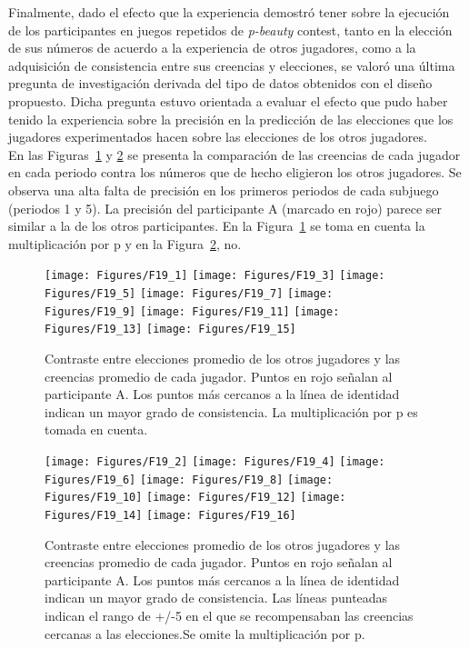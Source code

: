 Finalmente, dado el efecto que la experiencia demostró tener sobre la ejecución de los participantes en juegos repetidos de \textit{p-beauty} contest, tanto en la elección de sus números de acuerdo a la experiencia de otros jugadores, como a la adquisición de consistencia entre sus creencias y elecciones, se valoró una última pregunta de investigación derivada del tipo de datos obtenidos con el diseño propuesto. Dicha pregunta estuvo orientada a evaluar el efecto que pudo haber tenido la experiencia sobre la precisión en la predicción de las elecciones que los jugadores experimentados hacen sobre las elecciones de los otros jugadores.\\

En las Figuras~\ref{fig:Precision_p} y \ref{fig:Precision_nop} se presenta la comparación de las creencias de cada jugador en cada periodo contra los números que de hecho eligieron los otros jugadores. Se observa una alta falta de precisión en los primeros periodos de cada subjuego (periodos 1 y 5). La precisión del participante A (marcado en rojo) parece ser similar a la de los otros participantes. En la Figura~\ref{fig:Precision_p} se toma en cuenta la multiplicación por p y en la Figura~\ref{fig:Precision_nop}, no.\\
   
\begin{figure}[hp]
\centering
\texttt{[image: Figures/F19\_1]} 
\texttt{[image: Figures/F19\_3]} 
\texttt{[image: Figures/F19\_5]} 
\texttt{[image: Figures/F19\_7]} 
\texttt{[image: Figures/F19\_9]} 
\texttt{[image: Figures/F19\_11]} 
\texttt{[image: Figures/F19\_13]} 
\texttt{[image: Figures/F19\_15]} 
\decoRule
\caption[Precisión en las creencias]{Contraste entre elecciones promedio de los otros jugadores y las creencias promedio de cada jugador. Puntos en rojo señalan al participante A. Los puntos más cercanos a la línea de identidad indican un mayor grado de consistencia.  La multiplicación por p es tomada en cuenta.}
\label{fig:Precision_p}
\end{figure}  


\begin{figure}[hp]
\centering
\texttt{[image: Figures/F19\_2]} 
\texttt{[image: Figures/F19\_4]} 
\texttt{[image: Figures/F19\_6]} 
\texttt{[image: Figures/F19\_8]} 
\texttt{[image: Figures/F19\_10]} 
\texttt{[image: Figures/F19\_12]} 
\texttt{[image: Figures/F19\_14]} 
\texttt{[image: Figures/F19\_16]} 
\decoRule
\caption[Precisión en las creencias]{Contraste entre elecciones promedio de los otros jugadores y las creencias promedio de cada jugador. Puntos en rojo señalan al participante A. Los puntos más cercanos a la línea de identidad indican un mayor grado de consistencia.  Las líneas punteadas indican el rango de +/-5 en el que se recompensaban las creencias cercanas a las elecciones.Se omite la multiplicación por p.}
\label{fig:Precision_nop}
\end{figure}  



